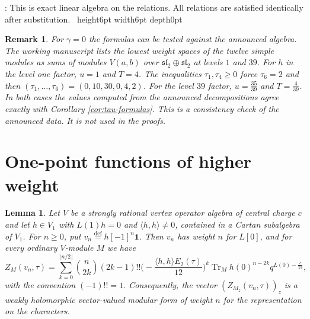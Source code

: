 \documentclass[leqno]{article}
\renewcommand{\geq}{\ensuremath{\geqslant}}
\newcommand{\qed}{\hfill \vrule height6pt  width6pt depth0pt}
\newcommand{\ov}{\overset}
\newtheorem{lemma}[thm]{Lemma}
\newtheorem{remark}[thm]{Remark}
\newenvironment{proof}[1][]{\noindent {\it Proof #1} : }{\hbox{~}\qed
\smallskip
}
\numberwithin{equation}{section}
\begin{document}
\begin{proof}
This is exact linear algebra on the relations. All relations are satisfied identically after substitution.
\end{proof}

\begin{remark}\normalfont
\label{rem:gamma0-check}
For $\gamma = 0$ the formulas can be tested against the announced algebra. The working manuscript \cite{Rie26b} lists the lowest weight spaces of the twelve simple modules as sums of modules $V(a,b)$ over $\mathfrak{sl}_2 \oplus \mathfrak{sl}_2$ at levels $1$ and $39$. For $h$ in the level one factor, $u = 1$ and $T = 4$. The inequalities $\tau_1,\tau_4 \geq 0$ force $\tau_6 = 2$ and then $(\tau_1,\ldots,\tau_6) = (0,10,30,0,4,2)$. For the level $39$ factor, $u = \frac{35}{39}$ and $T = \frac{4}{39}$. In both cases the values computed from the announced decompositions agree exactly with Corollary \ref{cor:tau-formulas}. This is a consistency check of the announced data. It is not used in the proofs.
\end{remark}

\section{One-point functions of higher weight}
\label{sec:higher-weight}

\begin{lemma}
\label{lem:hermite}
Let $V$ be a strongly rational vertex operator algebra of central charge $c$ and let $h \in V_1$ with $L(1)h = 0$ and $\langle h,h\rangle \neq 0$, contained in a Cartan subalgebra of $V_1$. For $n \geq 0$, put $v_n \ov{\mathrm{def}}{=} h[-1]^n\mathbf 1$. Then $v_n$ has weight $n$ for $L[0]$, and for every ordinary $V$-module $M$ we have
\begin{equation}
\label{eq:hermite}
Z_M(v_n,\tau) = \sum_{k = 0}^{\lfloor n/2\rfloor}\binom{n}{2k}(2k-1)!!\Big(-\frac{\langle h,h\rangle E_2(\tau)}{12}\Big)^k\operatorname{Tr}_M h(0)^{n-2k}q^{L(0)-\frac{c}{24}},
\end{equation}
with the convention $(-1)!! = 1$. Consequently, the vector $(Z_{M_z}(v_n,\tau))_z$ is a weakly holomorphic vector-valued modular form of weight $n$ for the representation on the characters.
\end{lemma}
\end{document}
